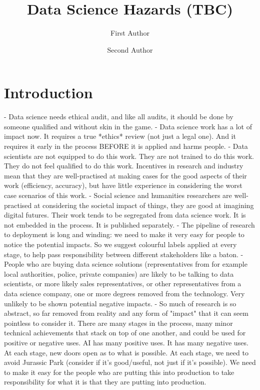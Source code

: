 \documentclass[fleqn,10pt]{olplainarticle}
\title{Data Science Hazards (TBC)}
\author[1]{First Author}
\author[2]{Second Author}
\affil[1]{Address of first author}
\affil[2]{Address of second author}
\begin{document}
\flushbottom
\maketitle
\thispagestyle{empty}

\section*{Introduction}

- Data science needs ethical audit, and like all audits, it should be done by someone qualified and without skin in the game.
  - Data science work has a lot of impact now. It requires a true *ethics* review (not just a legal one). And it requires it early in the process BEFORE it is applied and harms people.
  - Data scientists are not equipped to do this work. They are not trained to do this work. They do not feel qualified to do this work. Incentives in research and industry mean that they are well-practised at making cases for the good aspects of their work (efficiency, accuracy), but have little experience in considering the worst case scenarios of this work.
  - Social science and humanities researchers are well-practised at considering the societal impact of things, they are good at imagining digital futures. Their work tends to be segregated from data science work. It is not embedded in the process. It is published separately. 
- The pipeline of research to deployment is long and winding: we need to make it very easy for people to notice the potential impacts. So we suggest colourful labels applied at every stage, to help pass responsibility between different stakeholders like a baton.
  - People who are buying data science solutions (representatives from for example local authorities, police, private companies) are likely to be talking to data scientists, or more likely sales representatives, or other representatives from a data science company, one or more degrees removed from the technology. Very unlikely to be shown potential negative impacts.
  - So much of research is so abstract, so far removed from reality and any form of "impact" that it can seem pointless to consider it. There are many stages in the process, many minor technical achievements that stack on top of one another, and could be used for positive or negative uses. AI has many positive uses. It has many negative uses. At each stage, new doors open as to what is possible. At each stage, we need to avoid Jurassic Park (consider if it's good/useful, not just if it's possible). We need to make it easy for the people who are putting this into production to take responsibility for what it is that they are putting into production. 
  
\end{document}

